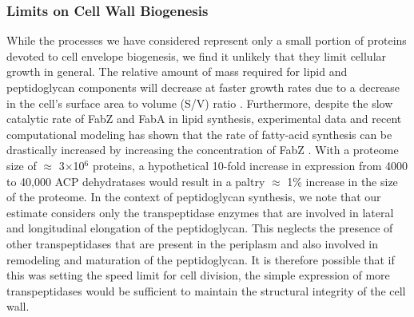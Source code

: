 \subsubsection{Limits on Cell Wall Biogenesis}
While the processes we have considered represent only a small portion of
proteins devoted to cell envelope biogenesis, we find it unlikely that they
limit cellular growth in general. The relative amount of mass required for
lipid and peptidoglycan components will decrease at faster growth rates due to a
decrease in the cell's surface area to volume (S/V) ratio \citep{ojkic2019}.
Furthermore, despite the slow catalytic rate of FabZ and FabA in lipid
synthesis, experimental data and recent computational modeling has shown that
the rate of fatty-acid synthesis can be drastically increased by increasing
the concentration of FabZ \citep{yu2011, ruppe2018}. With a proteome size of
$\approx$ 3$\times$10$^6$ proteins, a hypothetical 10-fold increase in
expression from 4000 to 40,000 ACP dehydratases would result in a paltry
$\approx$ 1\% increase in the size of the proteome. In the context of
peptidoglycan synthesis, we note that our estimate considers only the
transpeptidase enzymes that are involved in lateral and longitudinal elongation
of the peptidoglycan. This neglects the presence of other transpeptidases
that are present in the periplasm and also involved in remodeling and
maturation of the peptidoglycan. It is therefore possible that if this was
setting the speed limit for cell division, the simple expression of more
transpeptidases would be sufficient to maintain the structural integrity of the
cell wall.

